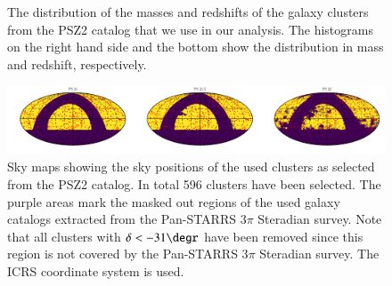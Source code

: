 \documentclass[iop, apjl, twocolappendix, numberedappendix]{emulateapj}
\begin{document}
\begin{figure}
\caption{The distribution of the masses and redshifts of the galaxy clusters
from the PSZ2 catalog that we use in our analysis. The histograms on the right
hand side and the bottom show the distribution in mass and redshift,
respectively.}
   \label{fig:planck_summary}
\end{figure}

\begin{figure}
    \includegraphics[width=\textwidth]{skymaps.pdf}
\caption{Sky maps showing the sky positions of the used clusters as
selected from the PSZ2 catalog. In total 596 clusters have been
selected. The purple areas mark the masked out regions of the used
galaxy catalogs extracted from the Pan-STARRS 3$\pi$ Steradian
survey. Note that all clusters with
$\delta<-31\degr$ have been removed since this region is not covered
by the Pan-STARRS 3$\pi$ Steradian survey. The ICRS coordinate
system is used.}
   \label{fig:skymaps} 
\end{figure}
\end{document}
